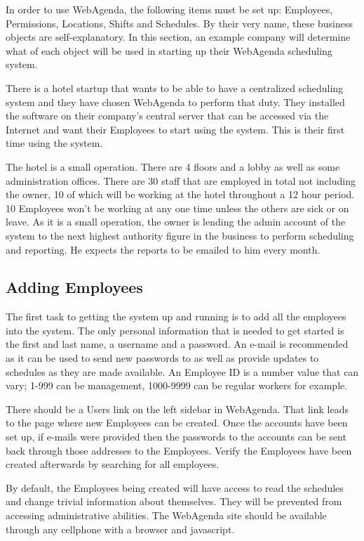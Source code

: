 \documentclass[a4paper,10pt]{report}
\begin{document}
\par \noindent \hspace*{1cm} In order to use WebAgenda, the following items must be set up: Employees, Permissions, Locations, Shifts and Schedules. By their very name, these business objects are self-explanatory. In this section, an example company will determine what of each object will be used in starting up their WebAgenda scheduling system.
\bigskip
\par \noindent \hspace*{1cm} There is a hotel startup that wants to be able to have a centralized scheduling system and they have chosen WebAgenda to perform that duty. They installed the software on their company's central server that can be accessed via the Internet and want their Employees to start using the system. This is their first time using the system.
\bigskip
\par \noindent \hspace*{1cm} The hotel is a small operation. There are 4 floors and a lobby as well as some administration offices. There are 30 staff that are employed in total not including the owner, 10 of which will be working at the hotel throughout a 12 hour period. 10 Employees won't be working at any one time unless the others are sick or on leave. As it is a small operation, the owner is lending the admin account of the system to the next highest authority figure in the business to perform scheduling and reporting. He expects the reports to be emailed to him every month. 

\subsection{Adding Employees}

\par \noindent \hspace*{1cm} The first task to getting the system up and running is to add all the employees into the system. The only personal information that is needed to get started is the first and last name, a username and a password. An e-mail is recommended as it can be used to send new passwords to as well as provide updates to schedules as they are made available. An Employee ID is a number value that can vary; 1-999 can be management, 1000-9999 can be regular workers for example.
\bigskip
\par \noindent \hspace*{1cm} There should be a Users link on the left sidebar in WebAgenda. That link leads to the page where new Employees can be created. Once the accounts have been set up, if e-mails were provided then the passwords to the accounts can be sent back through those addresses to the Employees. Verify the Employees have been created afterwards by searching for all employees.
\bigskip
\par \noindent \hspace*{1cm} By default, the Employees being created will have access to read the schedules and change trivial information about themselves. They will be prevented from accessing administrative abilities. The WebAgenda site should be available through any cellphone with a browser and javascript.
\end{document}
